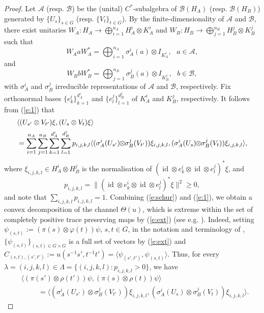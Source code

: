 \documentclass[11pt]{amsart}
\theoremstyle{definition}
\DeclareMathOperator{\id}{id}
\newcommand{\cl}[1]{\mathcal{#1}}
\newcommand{\la}{\langle}
\newcommand{\ra}{\rangle}
\newcommand{\ten}{\otimes}
\providecommand{\norm}[1]{\lVert#1\rVert}
\begin{document}
\begin{proof}
Let $\cl A$ (resp. $\cl B$) 
be the (unital) $C^*$-subalgebra of $\cl B(H_A)$ (resp. $\cl B(H_B)$)
generated by $\{U_s\}_{s\in G}$ (resp. $\{V_t\}_{t\in G}$). 
By the finite-dimensionality of $\cl A$ and $\cl B$, there exist unitaries $W_A:H_A\to\bigoplus_{i=1}^{n_A} H_A^i\ten K_A^i$ and $W_B:H_B\to\bigoplus_{j=1}^{n_B}H_B^j\ten K_B^j$ such that 
$$W_A a W_A^*=\bigoplus_{i=1}^{n_A} \sigma_A^i(a)\ten I_{K_A^i}, \ \ \ a\in \cl A,$$
and 
$$W_B b W_B^*=\bigoplus_{j=1}^{n_B} \sigma_B^j(a)\ten I_{K_B^j}, \ \ \ b\in \cl B,$$
with $\sigma_A^i$ and $\sigma_B^j$ irreducible representations of $\cl A$ and $\cl B$, respectively. Fix orthonormal bases $\{e^i_k\}_{k=1}^{d_A^i}$ and $\{e^j_l\}_{l=1}^{d_B^j}$ of $K_A^i$ and $K_B^j$, respectively. It follows from (\ref{e:1}) that
\begin{align*}&\la (U_{s'}\ten V_{t'})\xi,(U_s\ten V_t)\xi\ra\\
&=\sum_{i=1}^{n_A}\sum_{j=1}^{n_B}\sum_{k=1}^{d_A^i}\sum_{l=1}^{d_B^j}p_{i,j,k,l}\la(\sigma_A^i(U_{s'})
\hspace{-0.1cm}\ten \hspace{-0.1cm}\sigma_B^j(V_{t'}))\xi_{i,j,k,l},(\sigma_A^i(U_{s})\hspace{-0.1cm}\ten\hspace{-0.1cm}\sigma_B^j(V_{t}))\xi_{i,j,k,l}\ra,
\end{align*}
where $\xi_{i,j,k,l}\in H_A^i\ten H_B^j$ is the normalisation of $(\id\ten e_k^i\ten\id\ten e_l^j)^*\xi$, and 
$$p_{i,j,k,l}=\norm{(\id\ten e_k^i\ten \id \ten e_l^j)^*\xi}^2\geq 0,$$ 
and note that $\sum_{i,j,k,l}p_{i,j,k,l}=1$. Combining (\ref{e:schur}) and (\ref{e:1}), we obtain a convex decomposition of the channel $\Theta(u)$, which is extreme within the set of completely positive trace preserving maps by (\ref{e:ext}) (see e.g. \cite[Theorem 3]{LS}). Indeed, 
setting $\psi_{(s,t)}:=(\pi(s)\otimes\varphi(t))\psi$, $s,t\in G$, 
in the notation and terminology of \cite{LS}, $\{\psi_{(s,t)}\}_{(s,t)\in G\times G}$ is a full set of vectors by (\ref{e:ext}) and $C_{(s,t),(s',t')}:=u(s^{-1}s',t^{-1}t')=\langle \psi_{(s',t')},\psi_{(s,t)}\rangle$.
Thus, for every $\lambda=(i,j,k,l)\in\Lambda=\{(i,j,k,l) : p_{i,j,k,l} > 0\}$, we have
\begin{align*}&\la(\pi(s')\ten\rho(t'))\psi,(\pi(s)\ten\rho(t))\psi\ra\\
&\hspace{1cm} =\la(\sigma_A^i(U_{s'})\ten \sigma_B^j(V_{t'}))\xi_{i,j,k,l},(\sigma_A^i(U_{s})\ten\sigma_B^j(V_{t}))\xi_{i,j,k,l}\ra.
\end{align*}

\end{proof}
\end{document}
